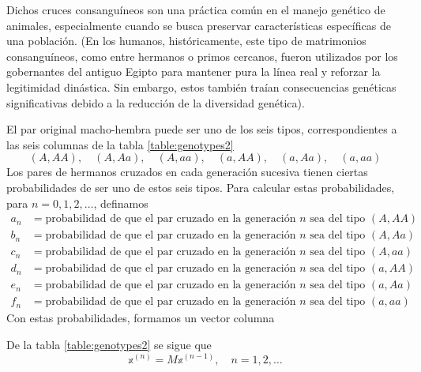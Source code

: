 Dichos cruces consanguíneos son una práctica común en el manejo genético de animales, especialmente cuando se busca preservar características específicas de una población. (En los humanos, históricamente, este tipo de matrimonios consanguíneos, como entre hermanos o primos cercanos, fueron utilizados por los gobernantes del antiguo Egipto para mantener pura la línea real y reforzar la legitimidad dinástica. Sin embargo, estos también traían consecuencias genéticas significativas debido a la reducción de la diversidad genética).

El par original macho-hembra puede ser uno de los seis tipos, correspondientes a las seis columnas de la tabla \ref{table:genotypes2}
$$(A, AA), \quad (A, Aa), \quad (A, aa), \quad (a, AA), \quad (a, Aa), \quad (a, aa)$$
Los pares de hermanos cruzados en cada generación sucesiva tienen ciertas probabilidades de ser uno de estos seis tipos. Para calcular estas probabilidades, para $n = 0, 1, 2, \dots$, definamos
\begin{align*}
    a_n & = \text{probabilidad de que el par cruzado en la generación } n \text{ sea del tipo } (A, AA) \\
    b_n & = \text{probabilidad de que el par cruzado en la generación } n \text{ sea del tipo } (A, Aa) \\
    c_n & = \text{probabilidad de que el par cruzado en la generación } n \text{ sea del tipo } (A, aa) \\
    d_n & = \text{probabilidad de que el par cruzado en la generación } n \text{ sea del tipo } (a, AA) \\
    e_n & = \text{probabilidad de que el par cruzado en la generación } n \text{ sea del tipo } (a, Aa) \\
    f_n & = \text{probabilidad de que el par cruzado en la generación } n \text{ sea del tipo } (a, aa)
\end{align*}
Con estas probabilidades, formamos un vector columna
\begin{matrizn}
\end{matrizn}
De la tabla \ref{table:genotypes2} se sigue que
\begin{equation}
    \mathbb{x}^{(n)} = M \mathbb{x}^{(n-1)}, \quad n = 1, 2, \dots \label{genetica10}
\end{equation}\newpage\noindent
